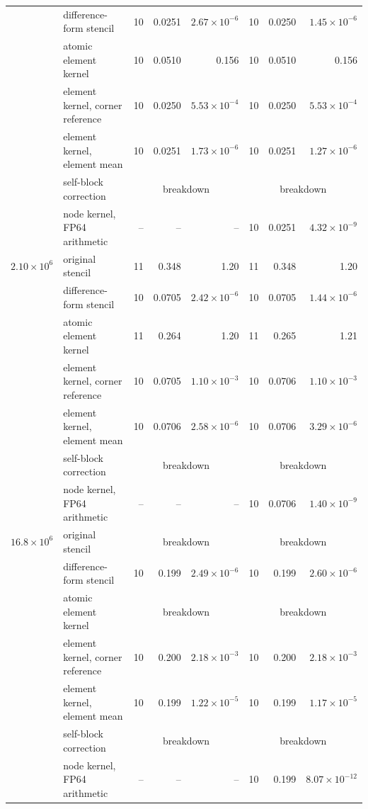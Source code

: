 \begin{tabular}{llrrrrrr}
 & difference-form stencil & 10 & 0.0251 & $2.67\times10^{-6}$ & 10 & 0.0250 & $1.45\times10^{-6}$ \\
 & atomic element kernel & 10 & 0.0510 & 0.156 & 10 & 0.0510 & 0.156 \\
 & element kernel, corner reference & 10 & 0.0250 & $5.53\times10^{-4}$ & 10 & 0.0250 & $5.53\times10^{-4}$ \\
 & element kernel, element mean & 10 & 0.0251 & $1.73\times10^{-6}$ & 10 & 0.0251 & $1.27\times10^{-6}$ \\
 & self-block correction & \multicolumn{3}{c}{breakdown} & \multicolumn{3}{c}{breakdown} \\
 & node kernel, FP64 arithmetic & -- & -- & -- & 10 & 0.0251 & $4.32\times10^{-9}$ \\
$2.10\times10^{6}$ & original stencil & 11 & 0.348 & 1.20 & 11 & 0.348 & 1.20 \\
 & difference-form stencil & 10 & 0.0705 & $2.42\times10^{-6}$ & 10 & 0.0705 & $1.44\times10^{-6}$ \\
 & atomic element kernel & 11 & 0.264 & 1.20 & 11 & 0.265 & 1.21 \\
 & element kernel, corner reference & 10 & 0.0705 & $1.10\times10^{-3}$ & 10 & 0.0706 & $1.10\times10^{-3}$ \\
 & element kernel, element mean & 10 & 0.0706 & $2.58\times10^{-6}$ & 10 & 0.0706 & $3.29\times10^{-6}$ \\
 & self-block correction & \multicolumn{3}{c}{breakdown} & \multicolumn{3}{c}{breakdown} \\
 & node kernel, FP64 arithmetic & -- & -- & -- & 10 & 0.0706 & $1.40\times10^{-9}$ \\
$16.8\times10^{6}$ & original stencil & \multicolumn{3}{c}{breakdown} & \multicolumn{3}{c}{breakdown} \\
 & difference-form stencil & 10 & 0.199 & $2.49\times10^{-6}$ & 10 & 0.199 & $2.60\times10^{-6}$ \\
 & atomic element kernel & \multicolumn{3}{c}{breakdown} & \multicolumn{3}{c}{breakdown} \\
 & element kernel, corner reference & 10 & 0.200 & $2.18\times10^{-3}$ & 10 & 0.200 & $2.18\times10^{-3}$ \\
 & element kernel, element mean & 10 & 0.199 & $1.22\times10^{-5}$ & 10 & 0.199 & $1.17\times10^{-5}$ \\
 & self-block correction & \multicolumn{3}{c}{breakdown} & \multicolumn{3}{c}{breakdown} \\
 & node kernel, FP64 arithmetic & -- & -- & -- & 10 & 0.199 & $8.07\times10^{-12}$ \\
\bottomrule
\end{tabular}

